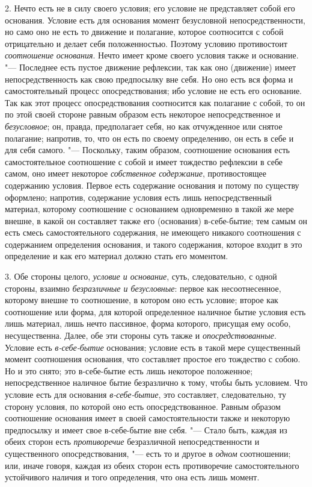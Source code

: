 2. Нечто есть не в силу своего условия; его условие не представляет собой
его основания. Условие есть для основания момент безусловной
непосредственности, но само оно не есть то движение и полагание, которое
соотносится с собой отрицательно и делает себя положенностью. Поэтому
условию противостоит {\em соотношение основания}. Нечто
имеет кроме своего условия также и основание. "--- Последнее есть пустое
движение рефлексии, так как оно (движение) имеет непосредственность как
свою предпосылку вне себя. Но оно есть вся форма и самостоятельный процесс
опосредствования; ибо условие не есть его основание. Так как этот процесс
опосредствования соотносится как полагание с собой, то он по этой своей
стороне равным образом есть некоторое непосредственное и
{\em безусловное}; он, правда, предполагает себя, но
как отчужденное или снятое полагание; напротив, то, что он есть по своему
определению, он есть в себе и для себя самого. "--- Поскольку, таким образом,
соотношение основания есть самостоятельное соотношение с собой и имеет
тождество рефлексии в себе самом, оно имеет некоторое
{\em собственное содержание}, противостоящее содержанию
условия. Первое есть содержание основания и потому по существу оформлено;
напротив, содержание условия есть лишь непосредственный материал, которому
соотношение с основанием одновременно в такой же мере внешне, в какой он
составляет также его (основания) в-себе-бытие; тем самым он есть смесь
самостоятельного содержания, не имеющего никакого соотношения с содержанием
определения основания, и такого содержания, которое входит в это
определение и как его материал должно стать его моментом.

3. Обе стороны целого, {\em условие и основание}, суть,
следовательно, с одной стороны, взаимно
{\em безразличные и безусловные}: первое как
несоотнесенное, которому внешне то соотношение, в котором оно есть условие;
второе как соотношение или форма, для которой определенное наличное бытие
условия есть лишь материал, лишь нечто пассивное, форма которого, присущая
ему особо, несущественна. Далее, обе эти стороны суть также и
{\em опосредствованные}. Условие есть
{\em в-себе-бытие} основания; условие есть в такой мере
существенный момент соотношения основания, что составляет простое его
тождество с собою. Но и это снято; это в-себе-бытие есть лишь некоторое
положенное; непосредственное наличное бытие безразлично к тому, чтобы быть
условием. Что условие есть для основания
{\em в-себе-бытие}, это составляет, следовательно, ту
сторону условия, по которой оно есть опосредствованное. Равным образом
соотношение основания имеет в своей самостоятельности также и некоторую
предпосылку и имеет свое в-себе-бытие вне себя. "--- Стало быть, каждая из
обеих сторон есть {\em противоречие} безразличной
непосредственности и существенного опосредствования, "--- есть то и другое в
{\em одном} соотношении; или, иначе говоря, каждая из
обеих сторон есть противоречие самостоятельного устойчивого наличия и того
определения, что она есть лишь момент.


